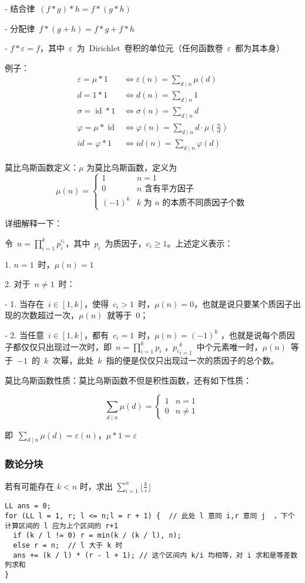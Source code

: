 \documentclass[UTF8]{ctexart}
\begin{document}
- 结合律\ $(f * g) * h=f * (g * h)$ 

- 分配律\ $f * (g+h)=f * g+f * h$ 

- $f*\varepsilon=f$，其中\ $\varepsilon$\ 为\ Dirichlet\ 卷积的单位元（任何函数卷\ $\varepsilon$\ 都为其本身）

例子：
\begin{align*} 
\varepsilon=\mu \ast 1&\iff\varepsilon(n)=\sum_{d\mid n}\mu(d)\ \\
d=1 \ast 1&\iff d(n)=\sum_{d\mid n}1\ \\ 
\sigma=\operatorname{id} \ast 1&\iff\sigma(n)=\sum_{d\mid n}d\  \\
\varphi=\mu \ast \operatorname{id}&\iff\varphi(n)=\sum_{d\mid n}d\cdot\mu(\frac{n}{d}) \\
id = \varphi \ast 1 &\iff id(n) = \sum_{d \mid n} \varphi(d)
\end{align*}

莫比乌斯函数定义：$\mu$ 为莫比乌斯函数，定义为
$$ \mu(n)= 
\begin{cases} 
1&n=1\\
0&n\text{ 含有平方因子}\\ 
(-1)^k&k\text{ 为\ }n\text{\ 的本质不同质因子个数}\ 
\end{cases} 
$$

详细解释一下：

令\ $n=\prod_{i=1}^kp_i^{c_i}$，其中\ $p_i$\ 为质因子，$c_i\ge 1$。上述定义表示：

1. $n=1$\ 时，$\mu(n)=1$

2. 对于\ $n\not= 1$\ 时：

   - 1. 当存在\ $i\in [1,k]$，使得\ $c_i > 1$\ 时，$\mu(n)=0$，也就是说只要某个质因子出现的次数超过一次，$\mu(n)$\ 就等于\ $0$；
   
   - 2. 当任意\ $i\in[1,k]$，都有\ $c_i=1$\ 时，$\mu(n)=(-1)^k$ ，也就是说每个质因子都仅仅只出现过一次时，即\ $n=\prod_{i=1}^kp_i$ ，${p_i}_{i=1}^k$\ 中个元素唯一时，$\mu(n)$\ 等于\ $-1$\ 的\ $k$\ 次幂，此处\ $k$\ 指的便是仅仅只出现过一次的质因子的总个数。

莫比乌斯函数性质：莫比乌斯函数不但是积性函数，还有如下性质：

$$ \sum_{d\mid n}\mu(d)= \begin{cases} 1&n=1\\ 0&n\neq 1\ \end{cases} $$

即\ $\sum_{d\mid n}\mu(d)=\varepsilon(n)$，$\mu * 1 =\varepsilon$

\subsubsection{数论分块}
若有可能存在 $k < n$ 时，求出 $\sum_{i=1}^n \lfloor \frac{k}{i} \rfloor$
\begin{framed}
\begin{lstlisting}
LL ans = 0;
for (LL l = 1, r; l <= n;l = r + 1) {  // 此处 l 意同 i,r 意同 j  ，下个计算区间的 l 应为上个区间的 r+1
  if (k / l != 0) r = min(k / (k / l), n);
  else r = n;  // l 大于 k 时
  ans += (k / l) * (r - l + 1); // 这个区间内 k/i 均相等，对 i 求和是等差数列求和
}
\end{lstlisting}
\end{framed}
\end{document}
